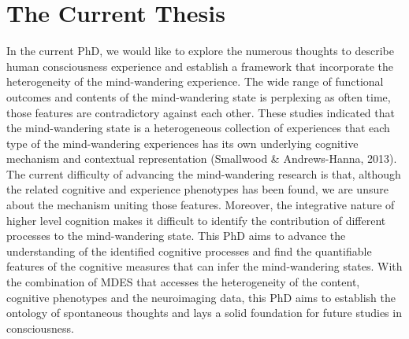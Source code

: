 \chapter{The Current Thesis}
\label{ch:cur}
In the current PhD, we would like to explore the numerous thoughts to describe human consciousness experience and establish a framework that incorporate the heterogeneity of the mind-wandering experience. The wide range of functional outcomes and contents of the mind-wandering state is perplexing as often time, those features are contradictory against each other. These studies indicated that the mind-wandering state is a heterogeneous collection of experiences that each type of the mind-wandering experiences has its own underlying cognitive mechanism and contextual representation (Smallwood \& Andrews-Hanna, 2013). The current difficulty of advancing the mind-wandering research is that, although the related cognitive and experience phenotypes has been found, we are unsure about the mechanism uniting those features. Moreover, the integrative nature of higher level cognition makes it difficult to identify the contribution of different processes to the mind-wandering state. This PhD aims to advance the understanding of the identified cognitive processes and find the quantifiable features of the cognitive measures that can infer the mind-wandering states. With the combination of MDES that accesses the heterogeneity of the content, cognitive phenotypes and the neuroimaging data, this PhD aims to establish the ontology of spontaneous thoughts and lays a solid foundation for future studies in consciousness. 